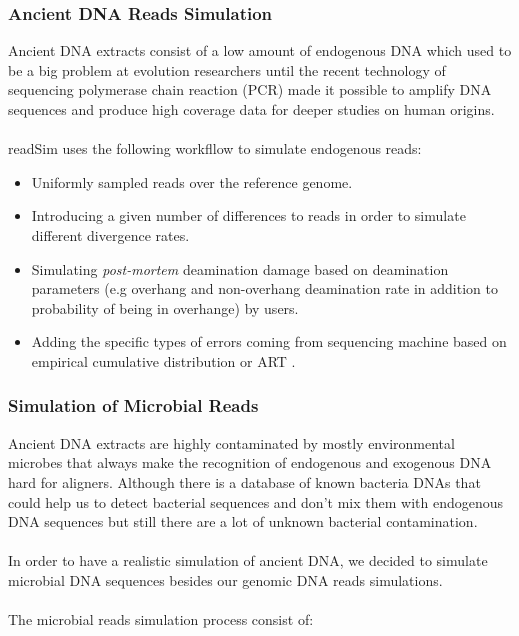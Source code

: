 \documentclass[11pt,a4paper]{report}
\begin{document}

\subsubsection{Ancient DNA Reads Simulation }  
\label{ Ancient DNA Reads Simulation}

Ancient DNA extracts consist of a low amount of endogenous DNA which used to be 
a big problem at evolution researchers until the recent technology of sequencing 
polymerase chain reaction (PCR) \cite{PCR} made it possible to amplify DNA 
sequences and produce high coverage data for deeper studies on human origins.
\\\\
readSim uses the following workfllow to simulate endogenous reads:
\begin{itemize}
 \item Uniformly sampled reads over the reference genome.

 \item Introducing a given number of differences to 
 reads in order to simulate different divergence rates.

 \item Simulating \emph{post-mortem} deamination damage based on deamination 
parameters (e.g overhang and non-overhang deamination rate in addition to 
probability of being in overhange) by users. 

 \item Adding the specific types of errors coming from sequencing machine based
on empirical cumulative distribution or ART .
\end{itemize}





\subsubsection{Simulation of Microbial Reads } \label{Simulation of Microbial Reads }

Ancient DNA extracts are highly contaminated by mostly environmental microbes 
that always make the recognition of endogenous and exogenous DNA hard for aligners.
Although there is a database of known bacteria DNAs that could help us to detect 
bacterial sequences and don't mix them with endogenous DNA sequences but still 
there are a lot of unknown bacterial contamination.
\\\\
In order to have a realistic simulation of ancient DNA, we decided to simulate 
microbial DNA sequences besides our genomic DNA reads simulations.
\\\\
The microbial reads simulation process consist of:
\end{document}
